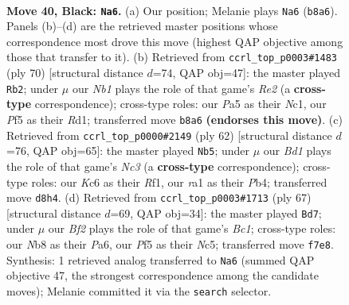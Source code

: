 \documentclass[11pt]{article}
\begin{document}
\clearpage

\begin{figure}[p]\centering
\begin{subfigure}{0.46\textwidth}\centering
\resizebox{\linewidth}{!}{%
\newchessgame
\chessboard[
  setfen={rn1b2r1/1p3b1p/2k3pP/pN2Pp2/P2p4/3R2P1/1B5K/R1N5 b - - 5 40},
  showmover=false,
  pgfstyle=straightmove, color=movearrow, markmove={b8-a6}
]}
\caption{}
\end{subfigure}\hfill
\begin{subfigure}{0.46\textwidth}\centering
\resizebox{\linewidth}{!}{%
\newchessgame
\chessboard[
  setfen={4r1k1/2r2pp1/1b3np1/p5B1/1np1P2P/5PPB/P3R2K/2NR4 w - - 0 36},
  showmover=false,
  pgfstyle=straightmove, color=movearrow, markmove={e2-b2}
]}
\caption{}
\end{subfigure}
\\[4pt]
\begin{subfigure}{0.46\textwidth}\centering
\resizebox{\linewidth}{!}{%
\newchessgame
\chessboard[
  setfen={2kr1r2/1pp5/5b1p/2P2p2/1P1P1Pp1/P1NRBn2/6KP/5R2 w - - 4 32},
  showmover=false,
  pgfstyle=straightmove, color=movearrow, markmove={c3-b5}
]}
\caption{}
\end{subfigure}\hfill
\begin{subfigure}{0.46\textwidth}\centering
\resizebox{\linewidth}{!}{%
\newchessgame
\chessboard[
  setfen={2br1r2/5p2/p7/1pnpk2B/3Np3/P5P1/1PP4P/1K1R1R2 b - - 12 34},
  showmover=false,
  pgfstyle=straightmove, color=movearrow, markmove={c8-d7}
]}
\caption{}
\end{subfigure}
\caption{\textbf{Move 40, Black: \texttt{Na6}.} (a) Our position; Melanie plays \texttt{Na6} (\texttt{b8a6}). Panels (b)--(d) are the retrieved master positions whose correspondence most drove this move (highest QAP objective among those that transfer to it). (b) Retrieved from \texttt{ccrl\_top\_p0003\#1483} (ply 70) [structural distance $d$=74, QAP obj=47]: the master played \texttt{Rb2}; under $\mu$ our \emph{Nb1} plays the role of that game's \emph{Re2} (a \textbf{cross-type} correspondence); cross-type roles: our \emph{P}a5 as their \emph{N}c1, our \emph{P}f5 as their \emph{R}d1; transferred move \texttt{b8a6} \textbf{(endorses this move)}. (c) Retrieved from \texttt{ccrl\_top\_p0000\#2149} (ply 62) [structural distance $d$=76, QAP obj=65]: the master played \texttt{Nb5}; under $\mu$ our \emph{Bd1} plays the role of that game's \emph{Nc3} (a \textbf{cross-type} correspondence); cross-type roles: our \emph{K}c6 as their \emph{R}f1, our \emph{r}a1 as their \emph{P}b4; transferred move \texttt{d8h4}. (d) Retrieved from \texttt{ccrl\_top\_p0003\#1713} (ply 67) [structural distance $d$=69, QAP obj=34]: the master played \texttt{Bd7}; under $\mu$ our \emph{Bf2} plays the role of that game's \emph{Bc1}; cross-type roles: our \emph{N}b8 as their \emph{P}a6, our \emph{P}f5 as their \emph{N}c5; transferred move \texttt{f7e8}. Synthesis: 1 retrieved analog transferred to \texttt{Na6} (summed QAP objective 47, the strongest correspondence among the candidate moves); Melanie committed it via the \texttt{search} selector.}
\label{fig:thought-m79}
\end{figure}
\end{document}
